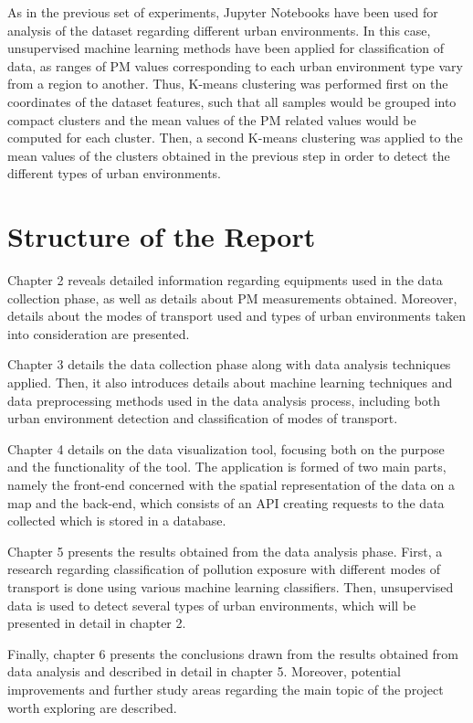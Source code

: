 \documentclass[bsc,frontabs,twoside,singlespacing, parskip,deptreport]{infthesis}     %
\begin{document}
As in the previous set of experiments, Jupyter Notebooks have been used for analysis of the dataset regarding different urban environments. In this case, unsupervised machine learning methods have been applied for classification of data, as ranges of PM values corresponding to each urban environment type vary from a region to another. Thus, K-means clustering was performed first on the coordinates of the dataset features, such that all samples would be grouped into compact clusters and the mean values of the PM related values would be computed for each cluster. Then, a second K-means clustering was applied to the mean values of the clusters obtained in the previous step in order to detect the different types of urban environments.

\section{Structure of the Report}

Chapter 2 reveals detailed information regarding equipments used in the data collection phase, as well as details about PM measurements obtained. Moreover, details about the modes of transport used and types of urban environments taken into consideration are presented.

Chapter 3 details the data collection phase along with data analysis techniques applied. Then, it also introduces details about machine learning techniques and data preprocessing methods used in the data analysis process, including both urban environment detection and classification of modes of transport.

Chapter 4 details on the data visualization tool, focusing both on the purpose and the functionality of the tool. The application is formed of two main parts, namely the front-end concerned with the spatial representation of the data on a map and the back-end, which consists of an API creating requests to the data collected which is stored in a database.

Chapter 5 presents the results obtained from the data analysis phase. First, a research regarding classification of pollution exposure with different modes of transport is done using various machine learning classifiers. Then, unsupervised data is used to detect several types of urban environments, which will be presented in detail in chapter 2.

Finally, chapter 6 presents the conclusions drawn from the results obtained from data analysis and described in detail in chapter 5. Moreover, potential improvements and further study areas regarding the main topic of the project worth exploring are described.
\end{document}
